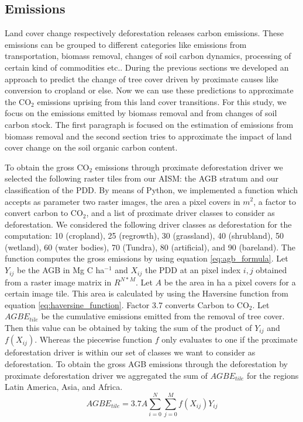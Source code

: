 	\subsection{Emissions}
		Land cover change respectively deforestation releases carbon emissions. These emissions can be grouped to different categories like emissions from transportation, biomass removal, changes of soil carbon dynamics, processing of certain kind of commodities etc.. During the previous sections we developed an approach to predict the change of tree cover driven by proximate causes like conversion to cropland or else. Now we can use these predictions to approximate the CO$_2$ emissions uprising from this land cover transitions. For this study, we focus on the emissions emitted by biomass removal and from changes of soil carbon stock. The first paragraph is focused on the estimation of emissions from biomass removal and the second section tries to approximate the impact of land cover change on the soil organic carbon content. 

		To obtain the gross CO$_2$ emissions through proximate deforestation driver we selected the following raster tiles from our \ac{AISM}: the \ac{AGB} stratum and our classification of the \ac{PDD}. By means of Python, we implemented a function which accepts as parameter two raster images, the area a pixel covers in $m^2$, a factor to convert carbon to CO$_2$, and a list of proximate driver classes to consider as deforestation. We considered the following driver classes as deforestation for the computation: 10 (cropland), 25 (regrowth), 30 (grassland), 40 (shrubland), 50 (wetland), 60 (water bodies), 70 (Tundra), 80 (artificial), and 90 (bareland). The function computes the gross emissions by using  equation \ref{eq:agb_formula}. Let $Y_{ij}$ be the \ac{AGB} in Mg C ha$^{-1}$ and $X_{ij}$ the \ac{PDD} at an pixel index $i,j$ obtained from a raster image matrix in $R^{N*M}$. Let $A$ be the area in ha a pixel covers for a certain image tile. This area is calculated by using the Haversine function from equation \ref{eq:haversine_function}. Factor 3.7 converts Carbon to CO$_2$. Let $AGBE_{tile}$ be the cumulative emissions emitted from the removal of tree cover. Then this value can be obtained by taking the sum of the product of $Y_{ij}$ and $f(X_{ij})$. Whereas the piecewise function $f$ only evaluates to one if the proximate deforestation driver is within our set of classes we want to consider as deforestation. To obtain the gross \ac{AGB} emissions through the deforestation by proximate deforestation driver we aggregated the sum of $AGBE_{tile}$ for the regions Latin America, Asia, and Africa.
		\begin{equation}
		\label{eq:agb_formula}
			AGBE_{tile} = 3.7A\displaystyle\sum_{i=0}^{N}\displaystyle\sum_{j=0}^{M} f(X_{ij})Y_{ij}
		\end{equation}

